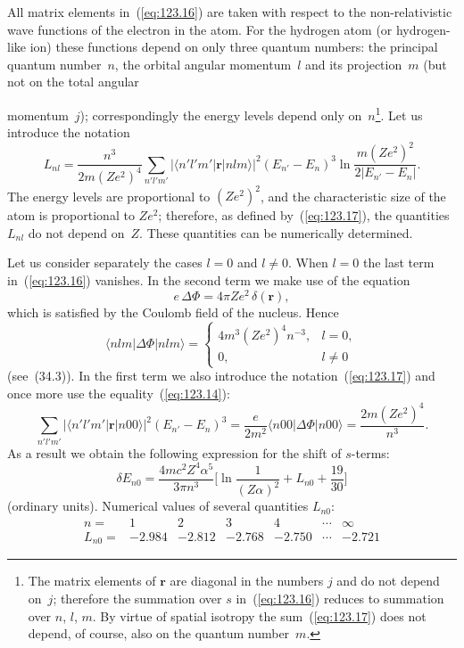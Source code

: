 All matrix elements in~(\ref{eq:123.16}) are taken with respect to the non-relativistic wave functions of the electron in the atom. For the hydrogen atom (or hydrogen-like ion) these functions depend on only three quantum numbers: the principal quantum number~$n$, the orbital angular momentum~$l$ and its projection~$m$ (but not on the total angular


\noindent momentum~$j$); correspondingly the energy levels depend only on~$n$\footnote{The matrix elements of $\mathbf{r}$ are diagonal in the numbers $j$ and do not depend on~$j$; therefore the summation over $s$ in~(\ref{eq:123.16}) reduces to summation over $n$, $l$, $m$. By virtue of spatial isotropy the sum~(\ref{eq:123.17}) does not depend, of course, also on the quantum number~$m$.}. Let us introduce the notation
\begin{equation}
L_{nl} = \frac{n^3}{2m(Ze^2)^4}\sum_{n'l'm'}\bigl|\langle n'l'm'|\mathbf{r}|nlm\rangle\bigr|^2(E_{n'} - E_n)^3\ln\frac{m(Ze^2)^2}{2|E_{n'} - E_n|}.
\label{eq:123.17}
\end{equation}
The energy levels are proportional to $(Ze^2)^2$, and the characteristic size of the atom is proportional to $Ze^2$; therefore, as defined by~(\ref{eq:123.17}), the quantities $L_{nl}$ do not depend on~$Z$. These quantities can be numerically determined.

Let us consider separately the cases $l = 0$ and $l \neq 0$. When $l = 0$ the last term in~(\ref{eq:123.16}) vanishes. In the second term we make use of the equation
\[
e\,\Delta\Phi = 4\pi Ze^2\,\delta(\mathbf{r}),
\]
which is satisfied by the Coulomb field of the nucleus. Hence
\[
\langle nlm|\Delta\Phi|nlm\rangle = \begin{cases} 4m^3(Ze^2)^4 n^{-3}, & l = 0, \\ 0, & l \neq 0 \end{cases}
\]
(see~(34.3)). In the first term we also introduce the notation~(\ref{eq:123.17}) and once more use the equality~(\ref{eq:123.14}):
\[
\sum_{n'l'm'}|\langle n'l'm'|\mathbf{r}|n00\rangle|^2(E_{n'} - E_n)^3 = \frac{e}{2m^2}\langle n00|\Delta\Phi|n00\rangle = \frac{2m(Ze^2)^4}{n^3}.
\]
As a result we obtain the following expression for the shift of $s$-terms:
\begin{equation}
\delta E_{n0} = \frac{4mc^2 Z^4\alpha^5}{3\pi n^3}\biggl[\ln\frac{1}{(Z\alpha)^2} + L_{n0} + \frac{19}{30}\biggr]
\label{eq:123.18}
\end{equation}
(ordinary units). Numerical values of several quantities $L_{n0}$:
\[
\begin{array}{lcccccc}
n = & 1 & 2 & 3 & 4 & \cdots & \infty \\
L_{n0} = & {-2.984} & {-2.812} & {-2.768} & {-2.750} & \cdots & {-2.721}
\end{array}
\]

